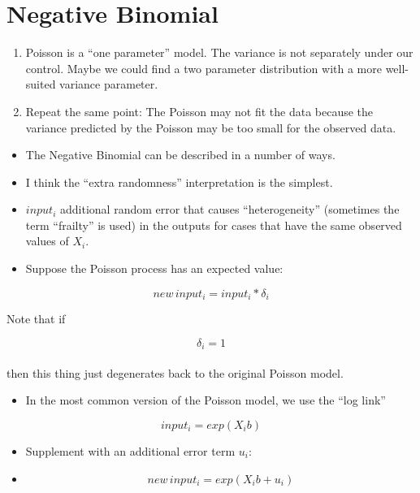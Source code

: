 \documentclass[10pt,english]{beamer}
\def\lyxframeend{} %
\begin{document}
\lyxframeend{}\section{Negative Binomial}


\lyxframeend{}
\begin{enumerate}
\item Poisson is a ``one parameter'' model. The variance is not separately
under our control. Maybe we could find a two parameter distribution
with a more well-suited variance parameter.
\item Repeat the same point: The Poisson may not fit the data because the
variance predicted by the Poisson may be too small for the observed
data.
\end{enumerate}

\lyxframeend{}
\begin{itemize}
\item The Negative Binomial can be described in a number of ways. 
\item I think the ``extra randomness'' interpretation is the simplest. 
\item $input_{i}$ additional random error that causes ``heterogeneity''
(sometimes the term ``frailty'' is used) in the outputs for cases
that have the same observed values of $X_{i}$. 
\item Suppose the Poisson process has an expected value:
\end{itemize}
\[
new\, input_{i}=input_{i}*\delta_{i}
\]


Note that if

\[
\delta_{i}=1
\]
\\
then this thing just degenerates back to the original Poisson model. 


\lyxframeend{}
\begin{itemize}
\item In the most common version of the Poisson model, we use the ``log
link'' 
\end{itemize}
\[
input_{i}=exp(X_{i}b)
\]

\begin{itemize}
\item Supplement with an additional error term $u_{i}$:
\item 
\[
new\, input_{i}=exp(X_{i}b+u_{i})
\]

\end{itemize}
\end{document}
